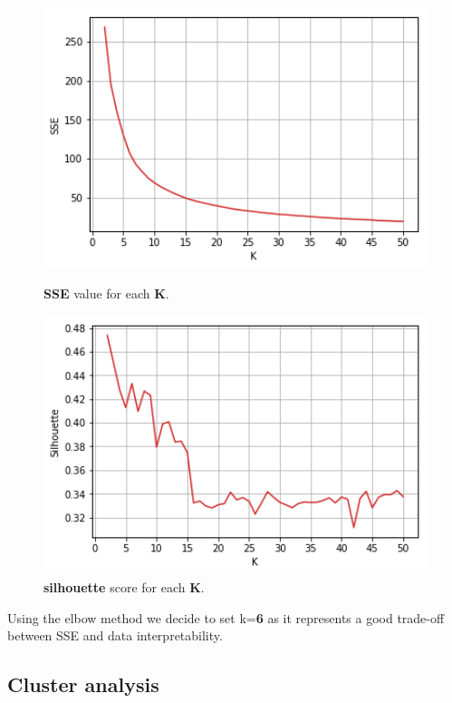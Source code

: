 \begin{figure}[h]
  \begin{minipage}[h]{.50\textwidth}
    \includegraphics[width=1\textwidth]{img/ch3/kmeans_sse}
     \caption{\textbf{SSE} value for each \textbf{K}.}
  \end{minipage}
    \begin{minipage}[h]{.50\textwidth}
    \includegraphics[width=1\textwidth]{img/ch3/kmeans_silhouette}
     \caption{\textbf{silhouette} score for each \textbf{K}.}
  \end{minipage}
\end{figure}

Using the elbow method we decide to set k=\textbf{6} as it represents a good trade-off between SSE and data interpretability.

\subsection{Cluster analysis}

